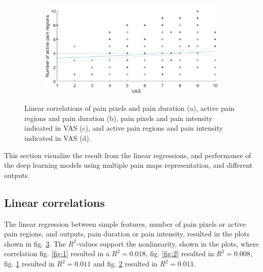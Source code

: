 \begin{figure} [b!]
\begin{tcolorbox}[colframe=black!30!black, colback=white]
\begin{subfigure}[b]{0.51\textwidth}
    \caption{}
    \label{fig:3}
  \end{subfigure}
  \hfill
  \hspace{2mm}
  \begin{subfigure}[b]{0.51\textwidth}
    \includegraphics[width=\textwidth]{Figures/vasregion}
       \caption{ }
    \label{fig:4}
  \end{subfigure}  
  \caption{Linear correlations of pain pixels and pain duration (a), active pain regions and pain duration (b), pain pixels and pain intensity indicated in VAS (c), and active pain regions and pain intensity indicated in VAS (d).}
  \label{fig:correlations}
\end{tcolorbox}
\end{figure}

This section visualize the result from the linear regressions, and performance of the deep learning models using multiple pain maps representation, and different outputs. 
\vspace{-0.3cm}

\subsection*{Linear correlations}
The linear regression between simple features, number of pain pixels or active pain regions, and outputs, pain duration or pain intensity, resulted in the plots shown in fig. \ref{fig:correlations}. The $R^2$-values support the nonlinearity, shown in the plots, where correlation fig. \ref{fig:1} resulted in a $R^2 = 0.018$, fig. \ref{fig:2} resulted in $R^2 = 0.008$, fig. \ref{fig:3} resulted in $R^2 = 0.011$ and fig. \ref{fig:4} resulted in $R^2 = 0.011$. 


